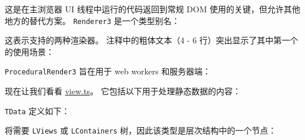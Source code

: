 


这是在主浏览器 UI 线程中运行的代码返回到常规 DOM 使用的关键，但允许其他地方的替代方案。
\texttt{Renderer3} 是一个类型别名：




这表示支持的两种渲染器。
注释中的粗体文本（4 - 6 行）突出显示了其中第一个的使用场景：




\texttt{ProceduralRender3} 旨在用于 web workers 和服务器端：




现在让我们看看
\href{https://github.com/angular/angular/blob/master/packages/core/src/render3/interfaces/view.ts}
{view.ts}。
它包括以下用于处理静态数据的内容：




\texttt{TData} 定义如下：




将需要 \texttt{LViews} 或 \texttt{LContainers} 树，因此该类型是层次结构中的一个节点：




